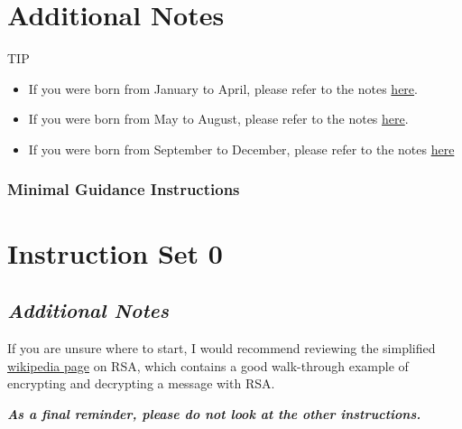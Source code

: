 {                \section*{Additional Notes}
                    TIP
                    \begin{itemize}
                        \item If you were born from January to April, please refer to the notes \href{https://github.com/brendonky18/Honors-Thesis.CTFs/blob/main/crypto-cracking/notes_0.md}{here}.
                        \item If you were born from May to August, please refer to the notes \href{https://github.com/brendonky18/Honors-Thesis.CTFs/blob/main/crypto-cracking/notes_1.md}{here}.
                        \item If you were born from September to December, please refer to the notes \href{https://github.com/brendonky18/Honors-Thesis.CTFs/blob/main/crypto-cracking/notes_1.md}{here}
                    \end{itemize}
            }
        \newpage
        \subsubsection{Minimal Guidance Instructions}
            {\parindent0pt\singlespacing
                \section*{Instruction Set 0}
                    \subsection*{\textit{Additional Notes}}
                        If you are unsure where to start, I would recommend reviewing the simplified \href{https://simple.wikipedia.org/wiki/RSA_algorithm}{wikipedia page} on RSA, which contains a good walk-through example of encrypting and decrypting a message with RSA.

                    \textbf{\textit{As a final reminder, please do not look at the other instructions.}}
            }
        \newpage
